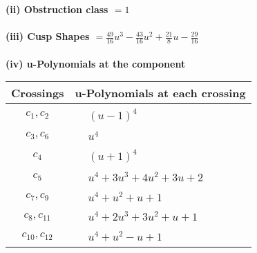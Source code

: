 \documentclass[1p]{elsarticle_modified}
\theoremstyle{definition}
\begin{document}
\flushleft \textbf{(ii) Obstruction class $= 1$}\\~\\
\flushleft \textbf{(iii) Cusp Shapes $= \frac{49}{16} u^3-\frac{43}{16} u^2+\frac{21}{8} u-\frac{29}{16}$}\\~\\
\newpage\renewcommand{\arraystretch}{1}
\flushleft \textbf{(iv) u-Polynomials at the component}\newline \\
\begin{tabular}{m{50pt}|m{274pt}}
Crossings & \hspace{64pt}u-Polynomials at each crossing \\
\hline $$\begin{aligned}c_{1},c_{2}\end{aligned}$$&$\begin{aligned}
&(u-1)^4
\end{aligned}$\\
\hline $$\begin{aligned}c_{3},c_{6}\end{aligned}$$&$\begin{aligned}
&u^4
\end{aligned}$\\
\hline $$\begin{aligned}c_{4}\end{aligned}$$&$\begin{aligned}
&(u+1)^4
\end{aligned}$\\
\hline $$\begin{aligned}c_{5}\end{aligned}$$&$\begin{aligned}
&u^4+3 u^3+4 u^2+3 u+2
\end{aligned}$\\
\hline $$\begin{aligned}c_{7},c_{9}\end{aligned}$$&$\begin{aligned}
&u^4+u^2+u+1
\end{aligned}$\\
\hline $$\begin{aligned}c_{8},c_{11}\end{aligned}$$&$\begin{aligned}
&u^4+2 u^3+3 u^2+u+1
\end{aligned}$\\
\hline $$\begin{aligned}c_{10},c_{12}\end{aligned}$$&$\begin{aligned}
&u^4+u^2- u+1
\end{aligned}$\\
\hline
\end{tabular}\\~\\
\end{document}
